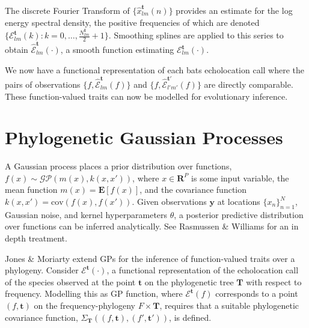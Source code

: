 \documentclass{ws-rv9x6}
\begin{document}
The discrete Fourier Transform \cite{antoniou2006digital}
of \(\{\hat{x}_{lm}^{\mathbf{t}}(n)\}\) provides an estimate for the log energy spectral density, the positive frequencies of which are denoted \(\{\mathcal{E}_{lm}^{\mathbf{t}}(k) : k = 0, \dots, \frac{ N_{lm}^{\mathbf{t}}}{2} + 1\}\). Smoothing splines \cite{friedman2001elements} are applied to this series to obtain \(\hat{\mathcal{E}}_{lm}^{\mathbf{t}}(\cdot)\), a smooth function estimating \(\mathcal{E}_{lm}^{\mathbf{t}}(\cdot)\).

We now have a functional representation of each bats echolocation call where the pairs of observations \(\{f, \hat{\mathcal{E}}_{lm}^{\mathbf{t}}(f)\}\) and \(\{f, \hat{\mathcal{E}}_{l'm'}^{{\mathbf{t}}'}(f)\}\) are directly comparable. These function-valued traits can now be modelled for evolutionary inference.

\section{Phylogenetic Gaussian Processes}
\label{sec:pgp}
A Gaussian process places a prior distribution over functions, \(f(x) \sim \mathcal{GP}(m(x), k (x, x'))\), where \(x \in \mathbf{R}^P\) is some input variable, the mean function \(m(x) = \mathbf{E}[f(x)]\), and the covariance function \(k(x, x') = \mathrm{cov}(f(x), f(x') )\). Given observations \(\mathbf{y}\) at locations \(\{x_n\}_{n=1}^N\), Gaussian noise, and kernel hyperparameters \(\theta\), a posterior predictive distribution over functions can be inferred analytically. See Rasmussen \& Williams \cite{rasmussen2006gaussian} for an in depth treatment.   

Jones \& Moriarty \cite{jones2013evolutionary} extend GPs for the inference of function-valued traits over a phylogeny. Consider \(\mathcal{E}^{\mathbf{t}}(\cdot)\), a functional representation of the echolocation call of the species observed at the point \(\mathbf{t}\) on the phylogenetic tree \(\mathbf{T}\) with respect to frequency. Modelling this as GP function, where \(\mathcal{E}^{\mathbf{t}}(f)\) corresponds to a point \((f, \mathbf{t})\) on the frequency-phylogeny \(F \times \mathbf{T}\), requires that a suitable phylogenetic covariance function, \(\Sigma_{\mathbf{T}}\left((f,\mathbf{t}), (f',\mathbf{t}')\right)\), is defined.
\end{document}
